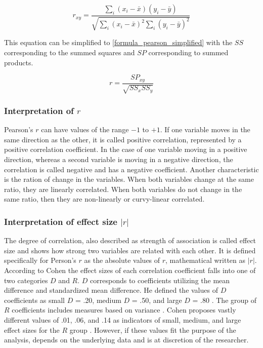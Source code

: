 \begin{equation}
\label{formula_pearson}	
	r_{xy} =  \frac{\sum_{i}{(x_i-\bar{x})(y_i-\bar{y})}}{\sqrt{\sum_{i}{(x_i-\bar{x})^2}\sum_{i}{(y_i-\bar{y})^2}}}
\end{equation}

\bigskip

This equation can be simplified to \cref{formula_pearson_simplified} with the $SS$ corresponding to the summed squares and $SP$ corresponding to summed products.

\smallskip

\begin{equation}
\label{formula_pearson_simplified}
	r =  \frac{SP_{xy}}{\sqrt{SS_x SS_y}}
\end{equation}

\subsubsection{Interpretation of $r$}
Pearson's $r$ can have values of the range $-1$ to $+1$. If one variable moves in the same direction as the other, it is called positive correlation, represented by a positive correlation coefficient. In the case of one variable moving in a positive direction, whereas a second variable is moving in a negative direction, the correlation is called negative and has a negative coefficient. Another characteristic is the ration of change in the variables. When both variables change at the same ratio, they are linearly correlated. When both variables do not change in the same ratio, then they are non-linearly or curvy-linear correlated. 

\subsubsection{Interpretation of effect size $|r|$}
The degree of correlation, also described as strength of association is called effect size and shows how strong two variables are related with each other. It is defined specifically for Person's $r$ as the absolute values of $r$, mathematical written as $|r|$. According to Cohen \parencite{Cohen1988} the effect sizes of each correlation coefficient falls into one of two categories $D$ and $R$. $D$ corresponds to coefficients utilizing the mean difference and standardized mean difference. He defined the values of $D$ coefficients as small $D$ = .20, medium $D$ = .50, and large $D$ = .80 \parencite{Piegorsch2002}. The group of $R$ coefficients includes measures based on variance \parencite{Walker2005}. Cohen proposes vastly different values of .01, .06, and .14 as indicators of small, medium, and large effect sizes for the $R$ group \parencite{Cohen1988}. However, if these values fit the purpose of the analysis, depends on the underlying data and is at discretion of the researcher.

